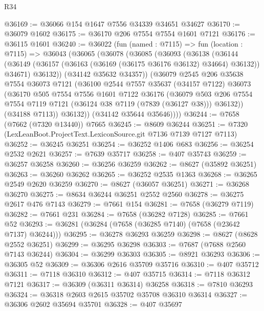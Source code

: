 \begin{lexlean}{R34}
\begin{coremodule}
@36169 := @36066 @154 @1647 @7556 @34339 @34651 @34627
@36170 := @36079 @1602
@36175 := @36170 @206 @7554 @7554 @1601 @7121
@36176 := @36115 @1601
@36240 := @36022
    (fun (named : @7115) =>
    fun (location : @7115) =>
    @36043
      (@36065
        (@36078
          (@36085
            (@36093
              (@36138
                (@36144
                  (@36149 (@36157 (@36163 (@36169 (@36175 @36176 @36132) @34664) @36132)) @34671)
                  @36132))
              (@34142 @35632 @34357))
            (@36079
              @2545
              @206
              @35638
              @7554
              @36073
              @7121
              (@36100
                @2544
                @7557
                @35637
                (@34157 @7122)
                @36073
                (@36170
                  @505
                  @7554
                  @7556
                  @1601
                  @7122
                  @36176
                  (@36079
                    @503
                    @206
                    @7554
                    @7554
                    @7119
                    @7121
                    (@36124 @38 @7119 (@7839 (@36127 @38)))
                    @36132))
                (@34188 @7113))
              @36132))
          (@34142 @35644 @35646))))
@36244 := @7658 (@7662 (@7320 @13440)) @7665
@36245 := @8609 @36244
@36251 := @7320 (LexLeanBoot.ProjectText.LexiconSource.git @7136 @7139 @7127 @7113)
@36252 := @36245 @36251
@36254 := @36252 @1406 @683
@36256 := @36254 @2532 @2621
@36257 := @7639 @35717
@36258 := @407 @35743
@36259 := @36257 @36258
@36260 := @36256 @36259
@36262 := @8627 (@35892 @36251)
@36263 := @36260 @36262
@36265 := @36252 @2535 @1363
@36268 := @36265 @2549 @2620 @36259
@36270 := @8627 (@36057 @36251)
@36271 := @36268 @36270
@36275 := @8634 @36244 @36251 @2552 @2560
@36278 := @36275 @2617 @476 @7143
@36279 := @7661 @154
@36281 := @7658 (@36279 @7119)
@36282 := @7661 @231
@36284 := @7658 (@36282 @7128)
@36285 := @7661 @52
@36293 := @36281 (@36284 (@7658 (@36285 @7140) (@7658 (@23642 @7137) @36244)))
@36295 := @36278 @36293 @36259
@36298 := @8627 (@8628 @2552 @36251)
@36299 := @36295 @36298
@36303 := @7687 (@7688 @2560 @7143 @36244)
@36304 := @36299 @36303
@36305 := @8921 @36293
@36306 := @36305 @52
@36309 := @36306 @2616 @35709 @35716
@36310 := @407 @35712
@36311 := @7118 @36310
@36312 := @407 @35715
@36314 := @7118 @36312 @7121
@36317 := @36309 (@36311 @36314) @36258
@36318 := @7810 @36293
@36324 := @36318 @2603 @2615 @35702 @35708 @36310 @36314
@36327 := @36306 @2602 @35694 @35701
@36328 := @407 @35697

\end{coremodule}
\end{lexlean}
